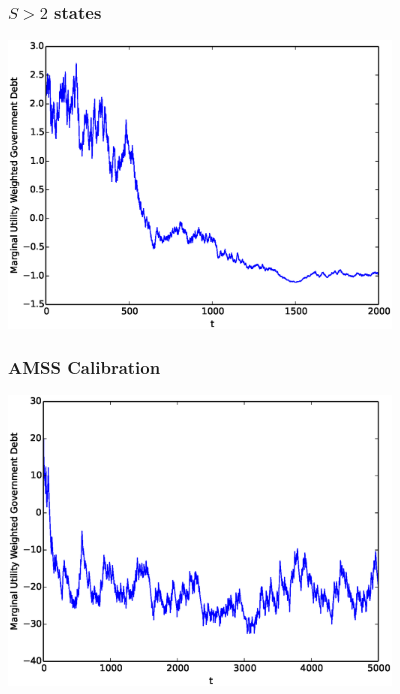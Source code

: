 \documentclass{beamer}
\begin{document}
\begin{frame}
	\frametitle{$S>2$ states}
	\begin{center}
	\includegraphics[width=4in]{Images/5stateiid.eps}
	\end{center}
\end{frame}


\begin{frame}
	\frametitle{AMSS Calibration}
	\begin{center}
	\includegraphics[width=4in]{Images/AMSS.eps}
	\end{center}
\end{frame}
\end{document}
